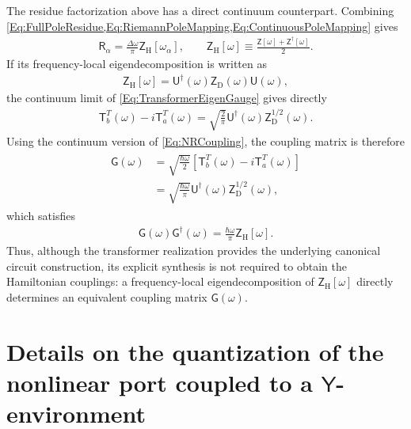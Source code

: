 \documentclass[prx,aps,twocolumn,article]{revtex4-2}
\newcommand{\msf}[1]{\mathsf{#1}}
\newcommand{\msT}{\msf{T}}
\newcommand{\msY}{\msf{Y}}
\newcommand{\msZ}{\msf{Z}}
\newcommand{\msZH}{\msZ_\mathrm{H}}
\newcommand{\msG}{\msf{G}}
\newcommand{\msU}{\msf{U}}
\newcommand{\msZD}{\msf{Z}_\mathrm{D}}
\newcommand{\msR}{\msf{R}}
\begin{document}
The residue factorization above has a direct continuum counterpart.
Combining \cref{Eq:FullPoleResidue,Eq:RiemannPoleMapping,Eq:ContinuousPoleMapping}
gives
\begin{align}
    \msR_\alpha
    =
    \frac{\Delta\omega}{\pi}
    \msZH[\omega_\alpha],
    \qquad
    \msZH[\omega]
    \equiv
    \frac{
        \msZ[\omega]
        +
        \msZ^\dag[\omega]
    }{2}.
    \label{Eq:ContinuumResidueMapping}
\end{align}
If its frequency-local eigendecomposition is written as
\begin{align}
    \msZH[\omega]
    =
    \msU^\dag(\omega)
    \msZD(\omega)
    \msU(\omega),
\end{align}
the continuum limit of \cref{Eq:TransformerEigenGauge} gives directly
\begin{align}
    \msT_b^T(\omega)
    -
    i\msT_a^T(\omega)
    =
    \sqrt{
        \frac{2}{\pi}
    }
    \msU^\dag(\omega)
    \msZD^{1/2}(\omega).
    \label{Eq:ContinuumTransformerGauge}
\end{align}
Using the continuum version of \cref{Eq:NRCoupling}, the coupling
matrix is therefore
\begin{align}
\begin{aligned}
    \msG(\omega)
    &=
    \sqrt{
        \frac{\hbar\omega}{2}
    }
    \left[
        \msT_b^T(\omega)
        -
        i\msT_a^T(\omega)
    \right]
    \\
    &=
    \sqrt{
        \frac{\hbar\omega}{\pi}
    }
    \msU^\dag(\omega)
    \msZD^{1/2}(\omega),
\end{aligned}
\end{align}
which satisfies
\begin{align}
    \msG(\omega)
    \msG^\dag(\omega)
    =
    \frac{\hbar\omega}{\pi}
    \msZH[\omega].
    \label{Eq:ZCouplingSpectralIdentities}
\end{align}
Thus, although the transformer realization provides the underlying
canonical circuit construction, its explicit synthesis is not
required to obtain the Hamiltonian couplings: a frequency-local
eigendecomposition of $\msZH[\omega]$ directly determines an
equivalent coupling matrix $\msG(\omega)$.



\section{Details on the quantization of the nonlinear port coupled to a
$\msY$-environment}
\label{AppSec:Y_construction_and_quantization}
\end{document}
